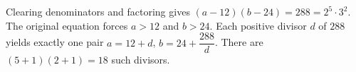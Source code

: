 Clearing denominators and factoring gives $(a-12)(b-24)=288=2^5\cdot3^2$. The original equation forces $a>12$ and $b>24$. Each positive divisor $d$ of $288$ yields exactly one pair $a=12+d$, $b=24+\dfrac{288}{d}$. There are $(5+1)(2+1)=\boxed{18}$ such divisors.

